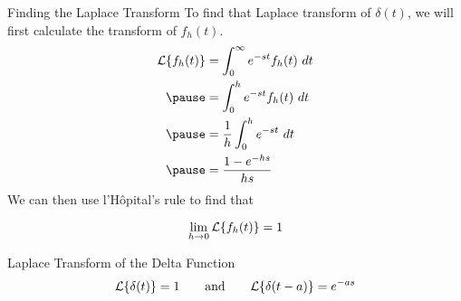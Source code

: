 \documentclass{beamer}
\begin{document}
\begin{frame}
\begin{block}{Finding the Laplace Transform}
To find that Laplace transform of $\delta(t)$, we will first calculate the transform of $f_h(t)$.
\begin{equation*}
\begin{aligned}
\laplace\{f_h(t)\}
&= \int_0^\infty e^{-st}f_h(t)~dt \\\pause
&= \int_0^h e^{-st}f_h(t)~dt \\\pause
&=\dfrac{1}{h} \int_0^h e^{-st}~dt \\\pause
&=\dfrac{1-e^{-hs}}{hs}
\end{aligned}
\end{equation*}\pause
We can then use l'H\^opital's rule to find that

\vspace{-4mm}
\begin{equation*}
\lim_{h\rightarrow 0}\mathcal{L}\{f_h(t)\}=1
\end{equation*}
\end{block}\pause
\begin{block}{Laplace Transform of the Delta Function}
\begin{equation*}
\mathcal{L}\{\delta(t)\}=1
\qquad\text{and}\qquad
\mathcal{L}\{\delta(t-a)\}=e^{-as}
\end{equation*}
\end{block}
\end{frame}
\end{document}

